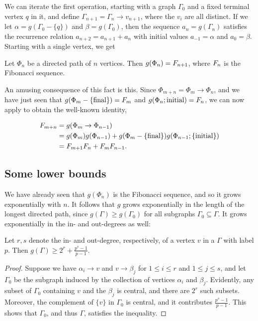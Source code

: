 We can iterate the first operation, starting with a graph $\Gamma_0$ and a fixed terminal vertex $q$ in it,
and define $\Gamma_{n + 1} = \Gamma_{n} \to v_{n + 1}$, where the $v_i$ are all distinct.
If we let $\alpha = g(\Gamma_0 - \{q\})$ and $\beta = g(\Gamma_0)$,
then the sequence $a_n = g(\Gamma_n)$ satisfies the recurrence relation $a_{n + 2} = a_{n + 1} + a_{n}$
with initial values $a_{-1} = \alpha$ and $a_0 = \beta$.
Starting with a single vertex, we get

\begin{prop}
	Let $\Phi_n$ be a directed path of $n$ vertices.
Then $g(\Phi_n) = F_{n + 1}$, where $F_{n}$ is the Fibonacci sequence.
\end{prop}

An amusing consequence of this fact is this.
Since $\Phi_{m + n} = \Phi_m \to \Phi_n$, and we have just seen that $g(\Phi_m - \{\text{final}\}) = F_{m}$ and $g(\Phi_n; \text{initial}) = F_{n}$, 
we can now apply \hyperref[eustick]{} to obtain the well-known identity, \begin{enumrealm}
\begin{align*}
	F_{m + n} &= g(\Phi_m \to \Phi_{n - 1}) \\
	&= g(\Phi_m)g(\Phi_{n - 1}) + g(\Phi_m - \{\text{final}\})g(\Phi_{n - 1}; \{\text{initial}\}) \\
	&= F_{m + 1}F_{n} + F_{m}F_{n - 1}.
\end{align*}\end{enumrealm}
\vspace{-\baselineskip}
\subsection{Some lower bounds}
We have already seen that $g(\Phi_n)$ is the Fibonacci sequence, and so it grows exponentially with $n$.
It follows that $g$ grows exponentially in the length of the longest directed path, since $g(\Gamma) \ge  g(\Gamma_0)$ for all subgraphs $\Gamma_0 \subseteq \Gamma$.
It grows exponentially in the in- and out-degrees as well:
\begin{lem}
	Let $r, s$ denote the in- and out-degree, respectively, of a vertex $v$ in a  $\Gamma$ with label $p$.
Then $g(\Gamma) \ge 2^r + \frac{p^s - 1}{p - 1}$.
\end{lem}
\begin{proof}
	Suppose we have $\alpha_i \to v$ and $v \to \beta_j$ for $1 \le i \le r$ and $1 \le j \le s$,
	and let $\Gamma_0$ be the subgraph induced by the collection of vertices $\alpha_i$ and $\beta_j$.
	Evidently, any subset of $\Gamma_0$ containing $v$ and the $\beta_j$ is central, and there are $2^r$ such subsets.
	Moreover, the complement of $\{v\}$ in $\Gamma_0$ is central, and it contributes $\frac{p^s - 1}{p - 1}$.
	This shows that $\Gamma_0$, and thus $\Gamma$, satisfies the inequality.
\end{proof}

